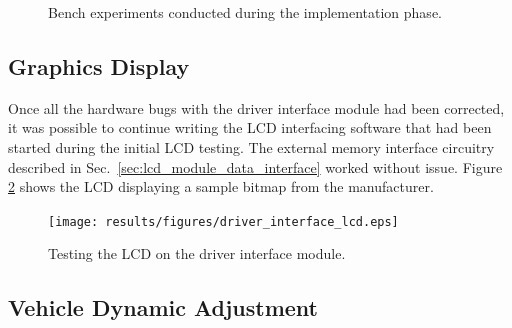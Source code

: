\begin{figure}[h!]
\centering
{}
\caption{Bench experiments conducted during the implementation phase.}
\label{fig:bench_experiments}
\end{figure}

\subsection{Graphics Display}

Once all the hardware bugs with the driver interface module had been corrected, it was possible to continue writing the LCD interfacing software that had been started during the initial LCD testing. The external memory interface circuitry described in Sec.\ \ref{sec:lcd_module_data_interface} worked without issue. Figure \ref{fig:driver_interface_lcd} shows the LCD displaying a sample bitmap from the manufacturer.

\begin{figure}[h!]
 \centering
 \texttt{[image: results/figures/driver\_interface\_lcd.eps]}
 \caption{Testing the LCD on the driver interface module.}
 \label{fig:driver_interface_lcd}
\end{figure}

\subsection{Vehicle Dynamic Adjustment}

